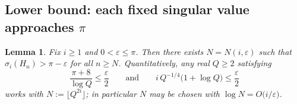 \documentclass[12pt]{article}
\newtheorem{lemma}{Lemma}
\theoremstyle{remark}
\begin{document}
\subsection{Lower bound: each fixed singular value approaches $\pi$}

\begin{lemma}\label{lem:lower}
Fix $i\ge1$ and $0<\varepsilon\le\pi$. Then there exists $N=N(i,\varepsilon)$ such that
$\sigma_i(H_n)>\pi-\varepsilon$ for all $n\ge N$. Quantitatively, any real $Q\ge2$ satisfying
\begin{equation}\label{eq:Qconds}
\frac{\pi+8}{\log Q}\le\frac{\varepsilon}{2}\qquad\text{and}\qquad
i\,Q^{-1/4}\bigl(1+\log Q\bigr)\le\frac{\varepsilon}{2}
\end{equation}
works with $N:=\lfloor Q^{2i}\rfloor$; in particular $N$ may be chosen with
$\log N=O\bigl(i/\varepsilon\bigr)$.
\end{lemma}
\end{document}
